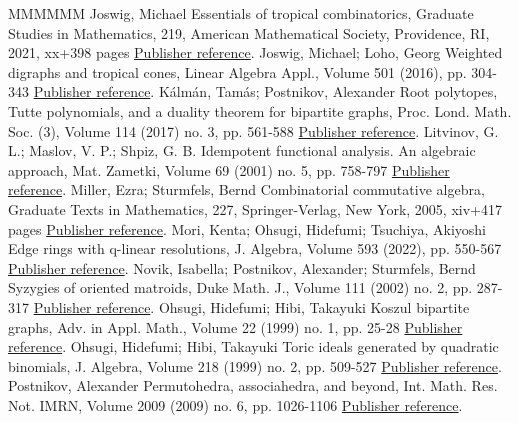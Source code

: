 \documentclass[11pt]{article}
\theoremstyle{definition}
\numberwithin{equation}{section}
\begin{document}
\begin{thebibliography}{MMMMMM}
 Joswig, Michael Essentials of tropical combinatorics, Graduate Studies in Mathematics, 219, American Mathematical Society, Providence, RI, 2021, xx+398 pages \href{https://alco.centre-mersenne.org/articles/10.5802/alco.404/#JoswigBook22}{Publisher reference}.
 Joswig, Michael; Loho, Georg Weighted digraphs and tropical cones, Linear Algebra Appl., Volume 501 (2016), pp. 304-343 \href{https://alco.centre-mersenne.org/articles/10.5802/alco.404/#JoswigLoho:2016}{Publisher reference}.
 Kálmán, Tamás; Postnikov, Alexander Root polytopes, Tutte polynomials, and a duality theorem for bipartite graphs, Proc. Lond. Math. Soc. (3), Volume 114 (2017) no. 3, pp. 561-588 \href{https://alco.centre-mersenne.org/articles/10.5802/alco.404/#KalPos}{Publisher reference}.
 Litvinov, G. L.; Maslov, V. P.; Shpiz, G. B. Idempotent functional analysis. An algebraic approach, Mat. Zametki, Volume 69 (2001) no. 5, pp. 758-797 \href{https://alco.centre-mersenne.org/articles/10.5802/alco.404/#litvinov+maslov+shpiz}{Publisher reference}.
 Miller, Ezra; Sturmfels, Bernd Combinatorial commutative algebra, Graduate Texts in Mathematics, 227, Springer-Verlag, New York, 2005, xiv+417 pages \href{https://alco.centre-mersenne.org/articles/10.5802/alco.404/#MillerSturmfels:2005}{Publisher reference}.
 Mori, Kenta; Ohsugi, Hidefumi; Tsuchiya, Akiyoshi Edge rings with q-linear resolutions, J. Algebra, Volume 593 (2022), pp. 550-567 \href{https://alco.centre-mersenne.org/articles/10.5802/alco.404/#MorOhsTsu}{Publisher reference}.
 Novik, Isabella; Postnikov, Alexander; Sturmfels, Bernd Syzygies of oriented matroids, Duke Math. J., Volume 111 (2002) no. 2, pp. 287-317 \href{https://alco.centre-mersenne.org/articles/10.5802/alco.404/#NPS}{Publisher reference}.
 Ohsugi, Hidefumi; Hibi, Takayuki Koszul bipartite graphs, Adv. in Appl. Math., Volume 22 (1999) no. 1, pp. 25-28 \href{https://alco.centre-mersenne.org/articles/10.5802/alco.404/#ohsugihibikoszul1999}{Publisher reference}.
 Ohsugi, Hidefumi; Hibi, Takayuki Toric ideals generated by quadratic binomials, J. Algebra, Volume 218 (1999) no. 2, pp. 509-527 \href{https://alco.centre-mersenne.org/articles/10.5802/alco.404/#ohsugihibi1999}{Publisher reference}.
 Postnikov, Alexander Permutohedra, associahedra, and beyond, Int. Math. Res. Not. IMRN, Volume 2009 (2009) no. 6, pp. 1026-1106 \href{https://alco.centre-mersenne.org/articles/10.5802/alco.404/#postnikov2009permutohedra}{Publisher reference}.

\end{thebibliography}
\end{document}
